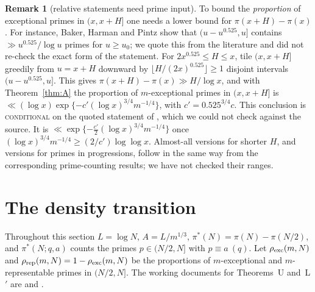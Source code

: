 \documentclass[10pt,reqno]{amsart}
\theoremstyle{definition}
\newtheorem{remark}[theorem]{Remark}
\newcommand{\status}[1]{\textup{\textsc{#1}}}
\begin{document}
\begin{remark}[relative statements need prime input]\label{rem:relative}
To bound the \emph{proportion} of exceptional primes in $(x,x+H]$ one
needs a lower bound for $\pi(x+H)-\pi(x)$.  For instance, Baker, Harman
and Pintz \cite{BHP} show that $(u-u^{0.525},u]$ contains
$\gg u^{0.525}/\log u$ primes for $u\geq u_0$; we quote this from the
literature and did not re-check the exact form of the statement.  For
$2x^{0.525}\leq H\leq x$, tile $(x,x+H]$ greedily from $u=x+H$ downward
by $\lfloor H/(2x)^{0.525}\rfloor\geq1$ disjoint intervals
$(u-u^{0.525},u]$.  This gives $\pi(x+H)-\pi(x)\gg H/\log x$, and with
Theorem~\ref{thm:A} the proportion of $m$-exceptional primes in
$(x,x+H]$ is $\ll(\log x)\exp\{-c'(\log x)^{3/4}m^{-1/4}\}$, with
$c'=0.525^{3/4}c$.  This conclusion is \status{conditional} on the quoted
statement of \cite{BHP}, which we could not check against the source.  It is
$\ll\exp\{-\frac{c'}2(\log x)^{3/4}m^{-1/4}\}$ once
$(\log x)^{3/4}m^{-1/4}\geq(2/c')\log\log x$.  Almost-all versions for shorter $H$, and versions for
primes in progressions, follow in the same way from the corresponding
prime-counting results; we have not checked their ranges.
\end{remark}

\section{The density transition}\label{sec:transition}
Throughout this section $L=\log N$, $A=L/m^{1/3}$,
$\pi^*(N)=\pi(N)-\pi(N/2)$, and $\pi^*(N;q,a)$ counts the primes
$p\in(N/2,N]$ with $p\equiv a\ (q)$.  Let $\rho_{\rm exc}(m,N)$ and
$\rho_{\rm rep}(m,N)=1-\rho_{\rm exc}(m,N)$ be the proportions of
$m$-exceptional and $m$-representable primes in $(N/2,N]$.  The working
documents for Theorems~U and~L$'$ are \cite{MN2} and \cite{MN3}.
\end{document}
